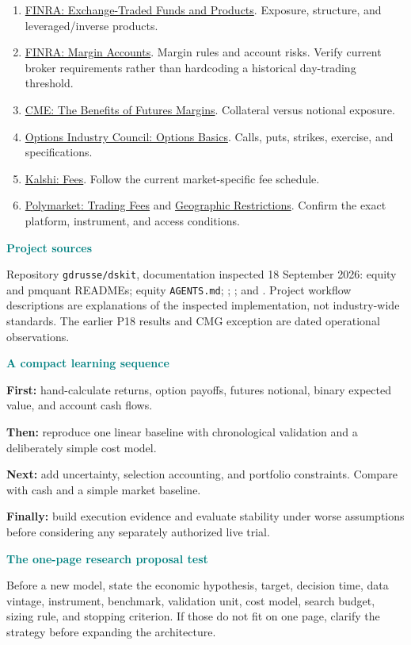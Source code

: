 \documentclass[10pt,letterpaper]{article}
\newcommand{\sub}[1]{\par\textbf{\textcolor{teal}{#1}}\par}
\begin{document}
\begin{enumerate}
\item \href{https://www.finra.org/investors/investing/investment-products/exchange-traded-funds-and-products}{FINRA: Exchange-Traded Funds and Products}. Exposure, structure, and leveraged/inverse products.
\item \href{https://www.finra.org/rules-guidance/key-topics/margin-accounts}{FINRA: Margin Accounts}. Margin rules and account risks. Verify current broker requirements rather than hardcoding a historical day-trading threshold.
\item \href{https://www.cmegroup.com/education/courses/understanding-the-benefits-of-futures/the-benefits-of-futures-margins}{CME: The Benefits of Futures Margins}. Collateral versus notional exposure.
\item \href{https://www.optionseducation.org/optionsoverview/options-basics}{Options Industry Council: Options Basics}. Calls, puts, strikes, exercise, and specifications.
\item \href{https://help.kalshi.com/en/articles/13823805-fees}{Kalshi: Fees}. Follow the current market-specific fee schedule.
\item \href{https://help.polymarket.com/en/articles/13364478-trading-fees}{Polymarket: Trading Fees} and \href{https://help.polymarket.com/en/articles/13364163-geographic-restrictions}{Geographic Restrictions}. Confirm the exact platform, instrument, and access conditions.
\end{enumerate}
\sub{Project sources}
Repository \texttt{gdrusse/dskit}, documentation inspected 18 September 2026: equity and pmquant READMEs; equity \texttt{AGENTS.md}; ; ; and . Project workflow descriptions are explanations of the inspected implementation, not industry-wide standards. The earlier P18 results and CMG exception are dated operational observations.
\sub{A compact learning sequence}
\textbf{First:} hand-calculate returns, option payoffs, futures notional, binary expected value, and account cash flows.\par
\textbf{Then:} reproduce one linear baseline with chronological validation and a deliberately simple cost model.\par
\textbf{Next:} add uncertainty, selection accounting, and portfolio constraints. Compare with cash and a simple market baseline.\par
\textbf{Finally:} build execution evidence and evaluate stability under worse assumptions before considering any separately authorized live trial.
\sub{The one-page research proposal test}
Before a new model, state the economic hypothesis, target, decision time, data vintage, instrument, benchmark, validation unit, cost model, search budget, sizing rule, and stopping criterion. If those do not fit on one page, clarify the strategy before expanding the architecture.
\end{document}
